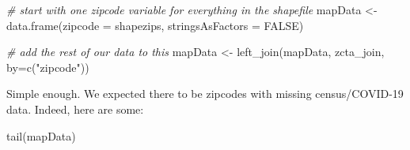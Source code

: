 \documentclass[
  openany]{book}
\newenvironment{Shaded}{\begin{snugshade}}{\end{snugshade}}
\newcommand{\AttributeTok}[1]{\textcolor[rgb]{0.77,0.63,0.00}{#1}}
\newcommand{\CommentTok}[1]{\textcolor[rgb]{0.56,0.35,0.01}{\textit{#1}}}
\newcommand{\ConstantTok}[1]{\textcolor[rgb]{0.00,0.00,0.00}{#1}}
\newcommand{\FunctionTok}[1]{\textcolor[rgb]{0.00,0.00,0.00}{#1}}
\newcommand{\NormalTok}[1]{#1}
\newcommand{\OtherTok}[1]{\textcolor[rgb]{0.56,0.35,0.01}{#1}}
\newcommand{\StringTok}[1]{\textcolor[rgb]{0.31,0.60,0.02}{#1}}
\begin{document}
\begin{Shaded}
\begin{Highlighting}[]
\CommentTok{\# start with one zipcode variable for everything in the shapefile}
\NormalTok{mapData }\OtherTok{\textless{}{-}} \FunctionTok{data.frame}\NormalTok{(}\AttributeTok{zipcode =}\NormalTok{ shapezips, }\AttributeTok{stringsAsFactors =} \ConstantTok{FALSE}\NormalTok{)}

\CommentTok{\# add the rest of our data to this}
\NormalTok{mapData }\OtherTok{\textless{}{-}} \FunctionTok{left\_join}\NormalTok{(mapData, zcta\_join, }\AttributeTok{by=}\FunctionTok{c}\NormalTok{(}\StringTok{"zipcode"}\NormalTok{))}
\end{Highlighting}
\end{Shaded}

Simple enough. We expected there to be zipcodes with missing census/COVID-19 data. Indeed, here are some:

\begin{Shaded}
\begin{Highlighting}[]
\FunctionTok{tail}\NormalTok{(mapData)}
\end{Highlighting}
\end{Shaded}
\end{document}
